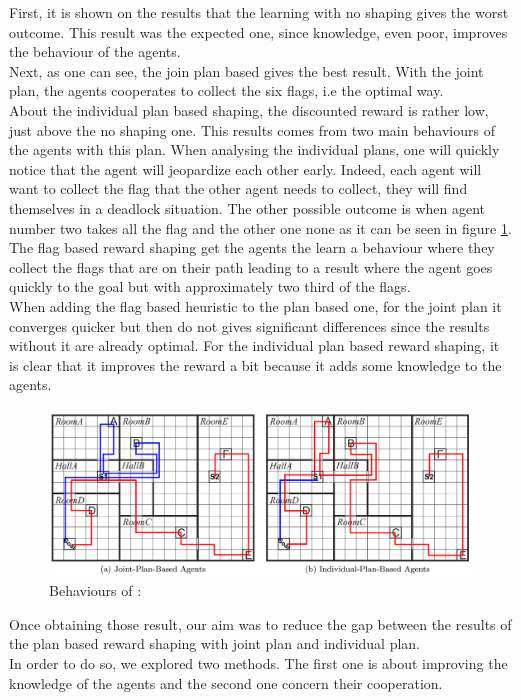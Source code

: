 \documentclass[letterpaper]{article}
\begin{document}
First, it is shown on the results that the learning with no shaping gives the worst outcome. This result was the expected one, since knowledge, even poor, improves the behaviour of the agents.\\
Next, as one can see, the join plan based gives the best result. With the joint plan, the agents cooperates to collect the six flags, i.e the optimal way.\\
About the individual plan based shaping, the discounted reward is rather low, just above the no shaping one. This results comes from two main behaviours of the agents with this plan. When analysing the individual plans, one will quickly notice that the agent will jeopardize each other early. Indeed, each agent will want to collect the flag that the other agent needs to collect, they will find themselves in a deadlock situation. The other possible outcome is when agent number two takes all the flag and the other one none as it can be seen in figure \ref{fig:behave}.\\
The flag based reward shaping get the agents the learn a behaviour where they collect the flags that are on their path leading to a result where the agent goes quickly to the goal but with approximately two third of the flags.\\
When adding the flag based heuristic to the plan based one, for the joint plan it converges quicker but then do not gives significant differences since the results without it are already optimal. For the individual plan based reward shaping, it is clear that it improves the reward a bit because it adds some knowledge to the agents.\\

\begin{figure}[h!]
  \includegraphics[width=\linewidth]{img/behavious.png}
  \caption{Behaviours of :}
  \label{fig:behave}
\end{figure}

Once obtaining those result, our aim was to reduce the gap between the results of the plan based reward shaping with joint plan and individual plan.\\
In order to do so, we explored two methods. The first one is about improving the knowledge of the agents and the second one concern their cooperation.
\end{document}
